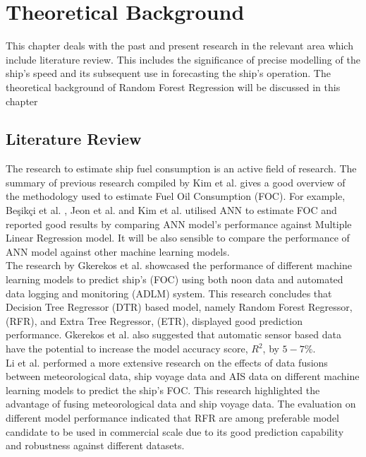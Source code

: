 \section{Theoretical Background} \label{theory}

This chapter deals with the past and present research in the relevant area which include literature review. This includes 
the significance of precise modelling of the ship's speed and its subsequent use in forecasting the ship's operation.
The theoretical background of Random Forest Regression will be discussed in this chapter 

\subsection{Literature Review}\label{litreview}

The research to estimate ship fuel consumption is an active field of research. The summary of previous research compiled by Kim et al. \cite{Kim.2021} gives a good overview of the methodology used to estimate Fuel Oil Consumption (FOC). For example, {Be{\c{s}}ik{\c{c}}i} et al. \cite{BalBesikci.2016}, Jeon et al. \cite{Jeon.2018} and Kim et al. \cite{Kim.2021} utilised ANN to estimate FOC and reported good results by comparing ANN model's performance against Multiple Linear Regression model. It will be also sensible to compare the performance of ANN model against other machine learning models. \\

The research by Gkerekos et al. \cite{Gkerekos.2019} showcased the performance of different machine learning models to predict ship's (FOC) using both noon data and automated data logging and monitoring (ADLM) system. This research concludes that Decision Tree Regressor (DTR) based model, namely Random Forest Regressor, (RFR), and Extra Tree Regressor, (ETR), displayed good prediction performance. Gkerekos et al. \cite{Gkerekos.2019} also suggested that automatic sensor based data have the potential to increase the model accuracy score, $R^2$, by $5-7\%$.\\

Li et al. \cite{Li.2022} performed a more extensive research on the effects of data fusions between meteorological data, ship voyage data and AIS data on different machine learning models to predict the ship's FOC. This research highlighted the advantage of fusing meteorological data and ship voyage data. The evaluation on different model performance indicated that RFR are among preferable model candidate to be used in commercial scale due to its good prediction capability and robustness against different datasets.\\

